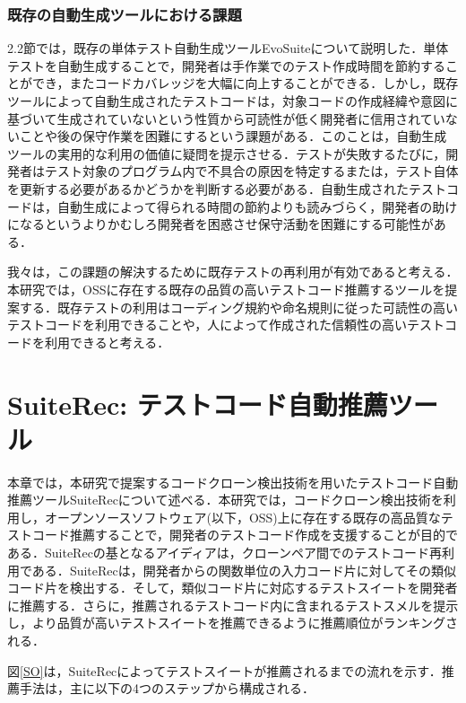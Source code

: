 \documentclass[12pt]{jarticle} %
\begin{document}
\subsubsection{既存の自動生成ツールにおける課題}

2.2節では，既存の単体テスト自動生成ツールEvoSuiteについて説明した．単体テストを自動生成することで，開発者は手作業でのテスト作成時間を節約することができ，またコードカバレッジを大幅に向上することができる．しかし，既存ツールによって自動生成されたテストコードは，対象コードの作成経緯や意図に基づいて生成されていないという性質から可読性が低く開発者に信用されていないことや後の保守作業を困難にするという課題がある\cite{b14,b15,b13}．このことは，自動生成ツールの実用的な利用の価値に疑問を提示させる．テストが失敗するたびに，開発者はテスト対象のプログラム内で不具合の原因を特定するまたは，テスト自体を更新する必要があるかどうかを判断する必要がある．自動生成されたテストコードは，自動生成によって得られる時間の節約よりも読みづらく，開発者の助けになるというよりかむしろ開発者を困惑させ保守活動を困難にする可能性がある\cite{b1}．


我々は，この課題の解決するために既存テストの再利用が有効であると考える．本研究では，OSSに存在する既存の品質の高いテストコード推薦するツールを提案する．既存テストの利用はコーディング規約や命名規則に従った可読性の高いテストコードを利用できることや，人によって作成された信頼性の高いテストコードを利用できると考える．


\newpage
\section{SuiteRec: テストコード自動推薦ツール}

本章では，本研究で提案するコードクローン検出技術を用いたテストコード自動推薦ツール{\sf SuiteRec}について述べる．本研究では，コードクローン検出技術を利用し，オープンソースソフトウェア(以下，OSS)上に存在する既存の高品質なテストコード推薦することで，開発者のテストコード作成を支援することが目的である．{\sf SuiteRec}の基となるアイディアは，クローンペア間でのテストコード再利用である．{\sf SuiteRec}は，開発者からの関数単位の入力コード片に対してその類似コード片を検出する．そして，類似コード片に対応するテストスイートを開発者に推薦する．さらに，推薦されるテストコード内に含まれるテストスメルを提示し，より品質が高いテストスイートを推薦できるように推薦順位がランキングされる．

図\ref{SO}は，{\sf SuiteRec}によってテストスイートが推薦されるまでの流れを示す．推薦手法は，主に以下の4つのステップから構成される．
\end{document}
